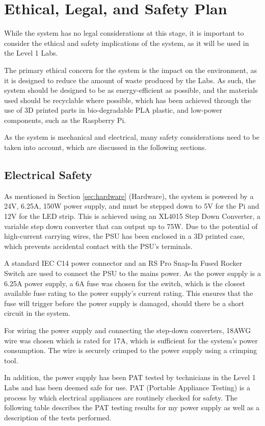 \section{Ethical, Legal, and Safety Plan} \label{sec:els}
While the system has no legal considerations at this stage, it is important to consider the ethical and safety implications of the system,
as it will be used in the Level 1 Labs.

The primary ethical concern for the system is the impact on the environment, as it is designed to reduce the amount of waste produced by the Labs. As such, the system should be designed to be as energy-efficient as possible, and the materials used should be recyclable where possible,
which has been achieved through the use of 3D printed parts in bio-degradable PLA plastic\cite{Ranakoti2022}, and low-power components, such as the Raspberry Pi.

As the system is mechanical and electrical, many safety considerations need to be taken into account, which are discussed in the following sections.
\subsection{Electrical Safety}
As mentioned in Section \ref{sec:hardware} (Hardware), the system is powered by a 24V, 6.25A, 150W power supply, and must be stepped down to 5V for the Pi and 12V for the LED strip. This is achieved using an XL4015 Step Down Converter\cite{xl4015}, a variable step down converter that can output up to 75W.
Due to the potential of high-current carrying wires, the PSU has been enclosed in a 3D printed case, which prevents accidental contact with the PSU's terminals.

A standard IEC C14 power connector and an RS Pro Snap-In Fused Rocker Switch\cite{rsproc14switch} are used to connect the PSU to the mains power.
As the power supply is a 6.25A power supply, a 6A fuse was chosen for the switch, which is the closest available fuse rating to the power supply's
current rating. This ensures that the fuse will trigger before the power supply is damaged, should there be a short circuit in the system.

For wiring the power supply and connecting the step-down converters, 18AWG wire was chosen which is rated for 17A\cite{18awgwire}, which is sufficient
for the system's power consumption. The wire is securely crimped to the power supply using a crimping tool.

In addition, the power supply has been PAT tested by technicians in the Level 1 Labs and has been deemed safe for use.
PAT (Portable Appliance Testing) is a process by which electrical appliances are routinely checked for safety\cite{patwiki}\cite{patspec}.
The following table describes the PAT testing results for my power supply as well as a description of the tests performed.

